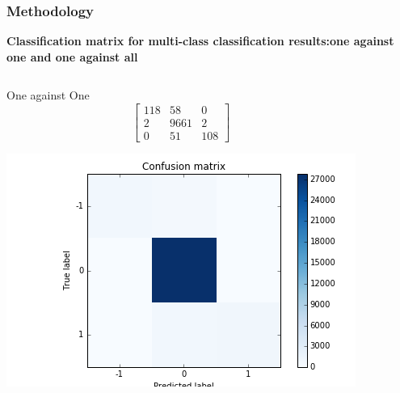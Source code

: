 \documentclass[xcolor={x11names,svgnames,dvipsnames}]{beamer}
\begin{document}
\begin{frame}
\frametitle{Methodology}
\textbf{Classification matrix for multi-class classification results:\alert{one against one and one against all}}\\
\begin{columns}
\column{2.3in}
	\begin{block}{One against One}
\begin{equation*}       
\left[           
  \begin{array}{ccc}   
    118&    58 &    0\\  
     2& 9661& 2\\  
    0  &  51 & 108
  \end{array}
\right]               
\end{equation*}
\begin{center}
     \includegraphics[width=1\textwidth, height=0.45\textheight]{one_vs_one.png}
\end{center}
\end{block}
\column{2.3in}


\end{columns}
\end{frame}
\end{document}
